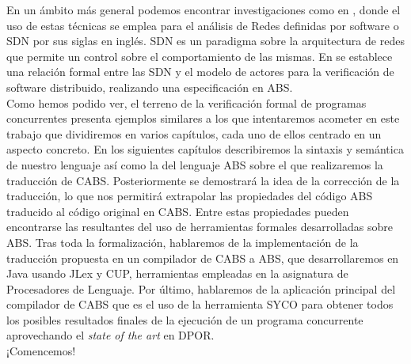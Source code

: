 En un ámbito más general podemos encontrar investigaciones como en \cite{costa1}, donde el uso de estas técnicas se emplea para el análisis de Redes definidas por software o SDN por sus siglas en inglés. SDN es un paradigma sobre la arquitectura de redes que permite un control sobre el comportamiento de las mismas. En \cite{costa1} se establece una relación formal entre las SDN y el modelo de actores para la verificación de software distribuido, realizando una especificación en ABS.\\

Como hemos podido ver, el terreno de la verificación formal de programas concurrentes presenta ejemplos similares a los que intentaremos acometer en este trabajo que dividiremos en varios capítulos, cada uno de ellos centrado en un aspecto concreto. En los siguientes capítulos describiremos la sintaxis y semántica de nuestro lenguaje así como la del lenguaje ABS sobre el que realizaremos la traducción de CABS. Posteriormente se demostrará la idea de la corrección de la traducción, lo que nos permitirá extrapolar las propiedades del código ABS traducido al código original en CABS. Entre estas propiedades pueden encontrarse las resultantes del uso de herramientas formales desarrolladas sobre ABS. Tras toda la formalización, hablaremos de la implementación de la traducción propuesta en un compilador de CABS a ABS, que desarrollaremos en Java usando JLex y CUP, herramientas empleadas en la asignatura de Procesadores de Lenguaje. Por último, hablaremos de la aplicación principal del compilador de CABS que es el uso de la herramienta SYCO para obtener todos los posibles resultados finales de la ejecución de un programa concurrente aprovechando el \emph{state of the art} en DPOR.\\

¡Comencemos!
